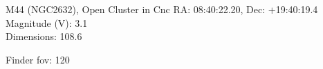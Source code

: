 \begin{block}{M44 (NGC2632), Open Cluster in Cnc}
    RA: 08:40:22.20, Dec: +19:40:19.4 \\ 
    Magnitude (V): 3.1 \\ 
    Dimensions: 108.6 

    Finder fov: 120 
\end{block}
